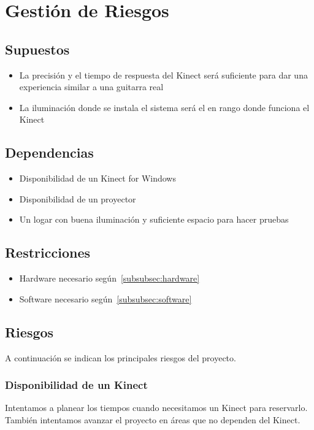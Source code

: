 \documentclass[a4paper,12pt]{article}
\begin{document}
\section{Gestión de Riesgos}
\subsection{Supuestos}
\begin{itemize}
        \item La precisión y el tiempo de respuesta del Kinect será suficiente
                para dar una experiencia similar a una guitarra real
        \item La iluminación donde se instala el sistema será el en rango donde
                funciona el Kinect
\end{itemize}

\subsection{Dependencias}
\begin{itemize}
        \item Disponibilidad de un Kinect for Windows
        \item Disponibilidad de un proyector
        \item Un logar con buena iluminación y suficiente espacio para hacer
                pruebas
\end{itemize}

\subsection{Restricciones}
\begin{itemize}
        \item Hardware necesario según~\ref{subsubsec:hardware}
        \item Software necesario según~\ref{subsubsec:software}
\end{itemize}

\subsection{Riesgos}
A continuación se indican los principales riesgos del proyecto.
\subsubsection{Disponibilidad de un Kinect}
Intentamos a planear los tiempos cuando necesitamos un Kinect para reservarlo.
También intentamos avanzar el proyecto en áreas que no dependen del Kinect.
\end{document}
